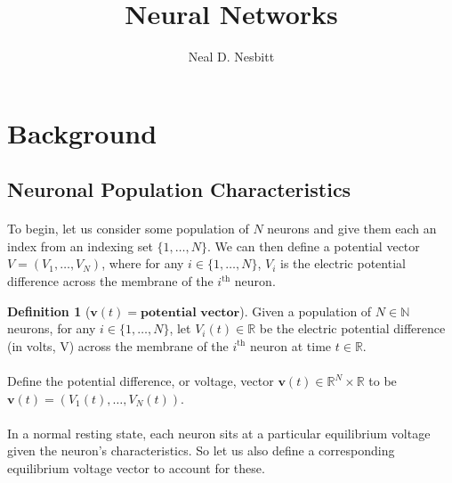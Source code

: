 \documentclass{article}
\title{Neural Networks}
\author{Neal D. Nesbitt}
\begin{document}
\maketitle

\theoremstyle{definition}
\newtheorem{definition}{Definition}[section]
\newtheorem{lemma}{Lemma}[section]


\section{Background}

\subsection{Neuronal Population Characteristics}

\paragraph{}
To begin, let us consider some population of $N$ neurons and give them each an index from an indexing set $\{ 1, \dots, N \}$. We can then define a potential vector $V = ( V_{1}, \dots, V_{N} )$, where for any $i \in \{ 1, \dots, N \}$, $V_{i}$ is the electric potential difference across the membrane of the $i^{\text{th}}$ neuron.

\begin{definition}[$\mathbf{v}(t) = \textbf{potential vector}$]\label{v}
Given a population of $N\in\mathbb{N}$ neurons, for any $i \in \{ 1, \dots, N \}$, let $V_{i}(t)\in\mathbb{R}$ be the electric potential difference (in volts, V) across the membrane of the $i^{\text{th}}$ neuron at time $t\in\mathbb{R}$.\\
\\
Define the potential difference, or voltage, vector $\mathbf{v}(t)\in\mathbb{R}^{N}\times\mathbb{R}$ to be $\mathbf{v}(t) = ( V_{1}(t), \dots, V_{N}(t) )$. 
\end{definition}

\paragraph{}
In a normal resting state, each neuron sits at a particular equilibrium voltage given the neuron's characteristics. So let us also define a corresponding equilibrium voltage vector to account for these.
\end{document}
